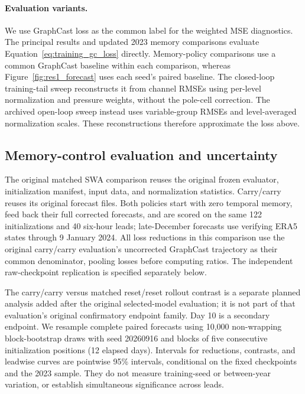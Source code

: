 \documentclass{article}
\newcommand{\vfourchange}[1]{{\color{blue}#1}}
\begin{document}
\paragraph{{Evaluation variants.}}
We use GraphCast loss as the common label for the weighted MSE diagnostics. The principal results \vfourchange{and updated 2023 memory comparisons} evaluate Equation~\ref{eq:training_gc_loss} directly. \vfourchange{Memory-policy comparisons use a common GraphCast baseline within each comparison, whereas Figure~\ref{fig:res1_forecast} uses each seed's paired baseline.} The closed-loop training-tail sweep \vfourchange{reconstructs} it from channel RMSEs using per-level normalization and pressure weights, without the pole-cell correction. The archived open-loop sweep instead uses variable-group RMSEs and level-averaged normalization scales. These reconstructions therefore approximate the loss above.

\subsection{\vfourchange{Memory-control evaluation and uncertainty}}
\label{app:memory_evaluation}

\vfourchange{The original matched SWA comparison reuses the original frozen evaluator, initialization manifest, input data, and normalization statistics. Carry/carry reuses its original forecast files. Both policies start with zero temporal memory, feed back their full corrected forecasts, and are scored on the same 122 initializations and 40 six-hour leads; late-December forecasts use verifying ERA5 states through 9 January 2024. All loss reductions in this comparison use the original carry/carry evaluation's uncorrected GraphCast trajectory as their common denominator, pooling losses before computing ratios. The independent raw-checkpoint replication is specified separately below.}

\vfourchange{The carry/carry versus matched reset/reset rollout contrast is a separate planned analysis added after the original selected-model evaluation; it is not part of that evaluation's original confirmatory endpoint family. Day 10 is a secondary endpoint. We resample complete paired forecasts using 10,000 non-wrapping block-bootstrap draws with seed 20260916 and blocks of five consecutive initialization positions (12 elapsed days). Intervals for reductions, contrasts, and leadwise curves are pointwise 95\% intervals, conditional on the fixed checkpoints and the 2023 sample. They do not measure training-seed or between-year variation, or establish simultaneous significance across leads.}
\end{document}

